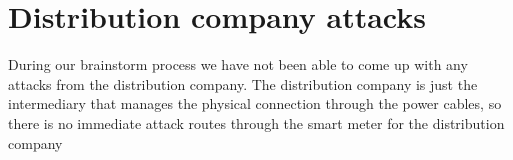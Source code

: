 
\section{Distribution company attacks}
During our brainstorm process we have not been able to come up with any attacks from the distribution company.
The distribution company is just the intermediary that manages the physical connection through the power cables, so there is no immediate attack routes through the smart meter for the distribution company